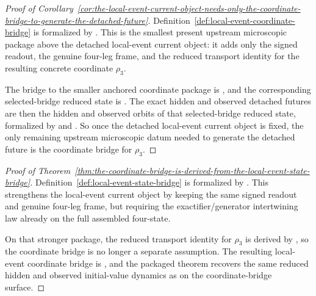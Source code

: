 \begin{proof}[Proof of Corollary~\ref{cor:the-local-event-current-object-needs-only-the-coordinate-bridge-to-generate-the-detached-future}]
\label{proof:cor:the-local-event-current-object-needs-only-the-coordinate-bridge-to-generate-the-detached-future}
Definition~\ref{def:local-event-coordinate-bridge} is formalized by
. This is the smallest present
upstream microscopic package above the detached local-event current object: it
adds only the signed readout, the genuine four-leg frame, and the reduced
transport identity for the resulting concrete coordinate \(\rho_3\).

The bridge to the smaller anchored coordinate package is
,
and the corresponding selected-bridge reduced state is
. The
exact hidden and observed detached futures are then the hidden and observed
orbits of that selected-bridge reduced state, formalized by
and
.
So once the detached local-event current object is fixed, the only remaining
upstream microscopic datum needed to generate the detached future is the
coordinate bridge for \(\rho_3\).
\end{proof}

\begin{proof}[Proof of Theorem~\ref{thm:the-coordinate-bridge-is-derived-from-the-local-event-state-bridge}]
\label{proof:thm:the-coordinate-bridge-is-derived-from-the-local-event-state-bridge}
Definition~\ref{def:local-event-state-bridge} is formalized by
. This strengthens the local-event
current object by keeping the same signed readout and genuine four-leg frame,
but requiring the exactifier/generator intertwining law already on the full
assembled four-state.

On that stronger package, the reduced transport identity for \(\rho_3\) is
derived by , so
the coordinate bridge is no longer a separate assumption. The resulting
local-event coordinate bridge is
, and
the packaged theorem 
recovers the same reduced hidden and observed initial-value dynamics as on the
coordinate-bridge surface.
\end{proof}

